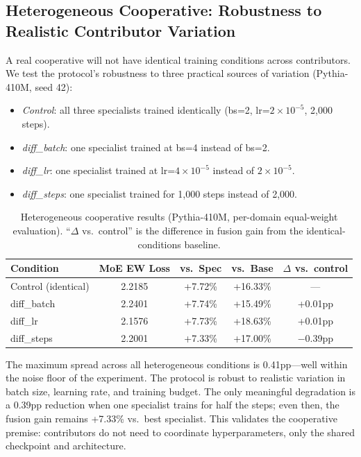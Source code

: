 \documentclass{article}
\begin{document}
\subsection{Heterogeneous Cooperative: Robustness to Realistic Contributor Variation}
\label{sec:heterogeneous}

A real cooperative will not have identical training conditions across contributors. We test the protocol's robustness to three practical sources of variation (Pythia-410M, seed 42):

\begin{itemize}[leftmargin=*, itemsep=1pt]
  \item \emph{Control}: all three specialists trained identically (bs=2, lr=$2\times10^{-5}$, 2,000 steps).
  \item \emph{diff\_batch}: one specialist trained at bs=4 instead of bs=2.
  \item \emph{diff\_lr}: one specialist trained at lr=$4\times10^{-5}$ instead of $2\times10^{-5}$.
  \item \emph{diff\_steps}: one specialist trained for 1,000 steps instead of 2,000.
\end{itemize}

\begin{table}[h]
\centering
\caption{Heterogeneous cooperative results (Pythia-410M, per-domain equal-weight evaluation). ``$\Delta$ vs.\ control'' is the difference in fusion gain from the identical-conditions baseline.}
\label{tab:heterogeneous}
\small
\begin{tabular}{lcccc}
\toprule
\textbf{Condition} & \textbf{MoE EW Loss} & \textbf{vs.\ Spec} & \textbf{vs.\ Base} & \textbf{$\Delta$ vs.\ control} \\
\midrule
Control (identical)  & 2.2185 & +7.72\% & +16.33\% & --- \\
diff\_batch          & 2.2401 & +7.74\% & +15.49\% & +0.01pp \\
diff\_lr             & 2.1576 & +7.73\% & +18.63\% & +0.01pp \\
diff\_steps          & 2.2001 & +7.33\% & +17.00\% & $-$0.39pp \\
\bottomrule
\end{tabular}
\end{table}

The maximum spread across all heterogeneous conditions is 0.41pp---well within the noise floor of the experiment. The protocol is robust to realistic variation in batch size, learning rate, and training budget. The only meaningful degradation is a 0.39pp reduction when one specialist trains for half the steps; even then, the fusion gain remains +7.33\% vs.\ best specialist. This validates the cooperative premise: contributors do not need to coordinate hyperparameters, only the shared checkpoint and architecture.
\end{document}
